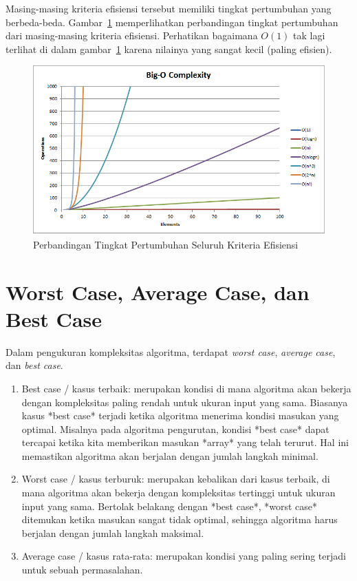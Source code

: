 Masing-masing kriteria efisiensi tersebut memiliki tingkat pertumbuhan yang berbeda-beda. Gambar~\ref{fig:allcomplexitycomparison} memperlihatkan perbandingan tingkat pertumbuhan dari masing-masing kriteria efisiensi. Perhatikan bagaimana $O(1)$ tak lagi terlihat di dalam gambar~\ref{fig:allcomplexitycomparison} karena nilainya yang sangat kecil (paling efisien).

\begin{figure}
    \centering
    \includegraphics[width=\textwidth]{fig/AllComplexityComparison}
    \caption{Perbandingan Tingkat Pertumbuhan Seluruh Kriteria Efisiensi}
    \label{fig:allcomplexitycomparison}
\end{figure}

    \FloatBarrier

\section{Worst Case, Average Case, dan Best Case}

Dalam pengukuran kompleksitas algoritma, terdapat \textit{worst case}, \textit{average case}, dan \textit{best case}.

\begin{enumerate}
    \item Best case / kasus terbaik: merupakan kondisi di mana algoritma akan bekerja dengan kompleksitas paling rendah untuk ukuran input yang sama. Biasanya kasus *best case* terjadi ketika algoritma menerima kondisi masukan yang optimal. Misalnya pada algoritma pengurutan, kondisi *best case* dapat tercapai ketika kita memberikan masukan *array* yang telah terurut. Hal ini memastikan algoritma akan berjalan dengan jumlah langkah minimal.
    \item Worst case / kasus terburuk: merupakan kebalikan dari kasus terbaik, di mana algoritma akan bekerja dengan kompleksitas tertinggi untuk ukuran input yang sama. Bertolak belakang dengan *best case*, *worst case* ditemukan ketika masukan sangat tidak optimal, sehingga algoritma harus berjalan dengan jumlah langkah maksimal.
    \item Average case / kasus rata-rata: merupakan kondisi yang paling sering terjadi untuk sebuah permasalahan.
\end{enumerate}

